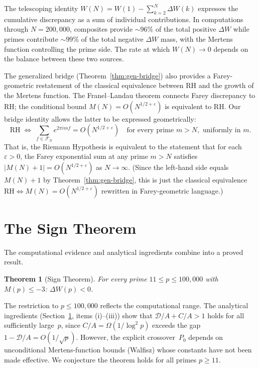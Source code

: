 \documentclass[11pt]{article}
\newtheorem{theorem}{Theorem}[section]
\theoremstyle{definition}
\newcommand{\F}{\mathcal{F}}
\begin{document}
The telescoping identity $W(N) = W(1) - \sum_{k=2}^{N} \Delta W(k)$
expresses the cumulative discrepancy as a sum of individual
contributions.  In computations through $N = 200{,}000$,
composites provide $\sim\!96\%$ of the total positive $\Delta W$
while primes contribute $\sim\!99\%$ of the total negative
$\Delta W$ mass, with the
Mertens function controlling the prime side.  The rate at which
$W(N) \to 0$ depends on the balance between these two sources.

The generalized bridge (Theorem~\ref{thm:gen-bridge}) also
provides a Farey-geometric restatement of the classical
equivalence between RH and the growth of the Mertens function.
The Franel--Landau theorem connects Farey discrepancy to RH\@;
the conditional bound
$M(N) = O(N^{1/2+\varepsilon})$ is equivalent to RH\@.
Our bridge identity allows the latter to be expressed
geometrically:
\[
  \text{RH} \;\Longleftrightarrow\;
  \sum_{f \in \F_N} e^{2\pi i m f} = O(N^{1/2+\varepsilon})
  \quad\text{for every prime } m > N, \text{ uniformly in } m.
\]
That is, the Riemann Hypothesis is equivalent to the statement
that for each $\varepsilon > 0$, the Farey exponential sum at any
prime $m > N$ satisfies $|M(N)+1| = O(N^{1/2+\varepsilon})$
as $N \to \infty$.  (Since the left-hand side equals $M(N)+1$ by
Theorem~\ref{thm:gen-bridge}, this is just the classical
equivalence $\text{RH} \Leftrightarrow M(N) = O(N^{1/2+\varepsilon})$
rewritten in Farey-geometric language.)


\section{The Sign Theorem}\label{sec:sign-theorem}

The computational evidence and analytical ingredients combine into
a proved result.

\begin{theorem}[Sign Theorem]\label{thm:sign}
For every prime $11 \le p \le 100{,}000$ with $M(p) \le -3$:
$\Delta W(p) < 0$.
\end{theorem}

\noindent The restriction to $p \le 100{,}000$ reflects the
computational range.  The analytical ingredients
(Section~\ref{sec:sign-theorem}, items (i)--(iii)) show that
$\mathcal{D}/A + C/A > 1$ holds for all sufficiently large~$p$,
since $C/A = \Omega(1/\log^2 p)$ exceeds the gap
$1 - \mathcal{D}/A = O(1/\sqrt{p})$.  However, the explicit
crossover~$P_0$ depends on unconditional Mertens-function bounds
(Walfisz) whose constants have not been made effective.  We
conjecture the theorem holds for all primes $p \ge 11$.
\end{document}
